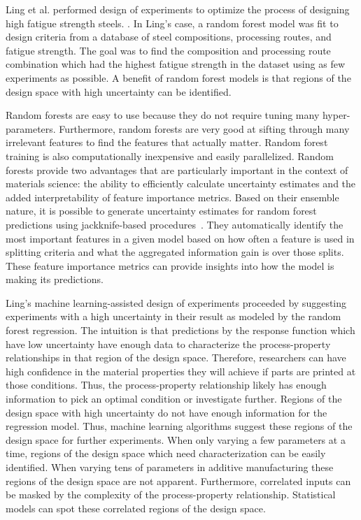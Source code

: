 Ling et al. performed design of experiments to optimize the process of designing high fatigue strength steels. \cite{Ling2017a}. In Ling's case, a random forest model was fit to design criteria from a database of steel compositions, processing routes, and fatigue strength. The goal was to find the composition and processing route combination which had the highest fatigue strength in the dataset using as few experiments as possible. A benefit of random forest models is that regions of the design space with high uncertainty can be identified.

Random forests are easy to use because they do not require tuning many hyper-parameters. Furthermore, random forests are very good at sifting through many irrelevant features to find the features that actually matter. Random forest training is also computationally inexpensive and easily parallelized. Random forests provide two advantages that are particularly important in the context of materials science: the ability to efficiently calculate uncertainty estimates and the added interpretability of feature importance metrics. Based on their ensemble nature, it is possible to generate uncertainty estimates for random forest predictions using jackknife-based procedures~\cite{Efron1992, Efron2014, Wager2014}. They automatically identify the most important features in a given model based on how often a feature is used in splitting criteria and what the aggregated information gain is over those splits. These feature importance metrics can provide insights into how the model is making its predictions. 

Ling's machine learning-assisted design of experiments proceeded by suggesting experiments with a high uncertainty in their result as modeled by the random forest regression. The intuition is that predictions by the response function which have low uncertainty have enough data to characterize the process-property relationships in that region of the design space. Therefore, researchers can have high confidence in the material properties they will achieve if parts are printed at those conditions. Thus, the process-property relationship likely has enough information to pick an optimal condition or investigate further. Regions of the design space with high uncertainty do not have enough information for the regression model. Thus, machine learning algorithms suggest these regions of the design space for further experiments. When only varying a few parameters at a time, regions of the design space which need characterization can be easily identified. When varying tens of parameters in additive manufacturing these regions of the design space are not apparent. Furthermore, correlated inputs can be masked by the complexity of the process-property relationship. Statistical models can spot these correlated regions of the design space.

